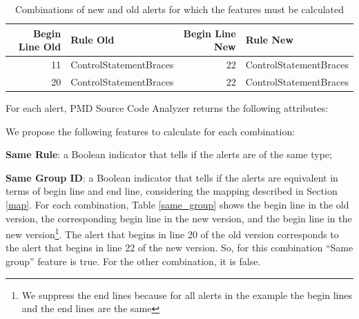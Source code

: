 \documentclass[
]{article}
\begin{document}
\small

\begin{table}[H]

\caption{\label{tab:unnamed-chunk-6}Combinations of new and old alerts for which the features must be calculated \label{combination}}
\centering
\begin{tabular}[t]{r|l|r|l}
\hline
Begin Line Old & Rule Old & Begin Line New & Rule New\\
\hline
11 & ControlStatementBraces & 22 & ControlStatementBraces\\
\hline
20 & ControlStatementBraces & 22 & ControlStatementBraces\\
\hline
\end{tabular}
\end{table}

\normalsize

\vspace{16pt}

For each alert, PMD Source Code Analyzer returns the following
attributes:

\vspace{16pt}

We propose the following features to calculate for each combination:

\textbf{Same Rule}: a Boolean indicator that tells if the alerts are of
the same type;

\textbf{Same Group ID}: a Boolean indicator that tells if the alerts are
equivalent in terms of begin line and end line, considering the mapping
described in Section \ref{map}. For each combination, Table
\ref{same_group} shows the begin line in the old version, the
corresponding begin line in the new version, and the begin line in the
new
version\footnote{We suppress the end lines because for all alerts in the 
example the begin lines and the end lines are the same}. The alert that
begins in line 20 of the old version corresponds to the alert that
begins in line 22 of the new version. So, for this combination ``Same
group'' feature is true. For the other combination, it is false.

\small

\begin{table}[H]

\caption{\label{tab:unnamed-chunk-7}Same group feature \label{same_group}}
\centering
{}
\end{table}
\end{document}

